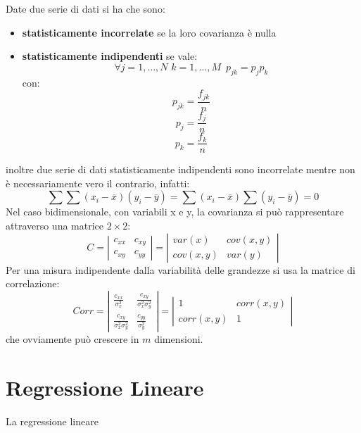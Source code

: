 \documentclass[a4paper,12pt, oneside]{book}
\begin{document}
Date due serie di dati si ha che sono:
\begin{itemize}
    \item \textbf{statisticamente incorrelate} se la loro covarianza è nulla
    \item \textbf{statisticamente indipendenti} se vale:
        \[ \forall j=1, \dots, N\,\,k=1, \dots, M\,\,\, p_{jk} = p_jp_k \]
             con:
            \[ p_{jk}=\frac{f_{jk}}{n} \]
            \[ p_{j}=\frac{f_{j}}{n} \]
            \[ p_{k}=\frac{f_{k}}{n} \]        
\end{itemize}
inoltre due serie di dati statisticamente indipendenti sono incorrelate mentre non è necessariamente vero il contrario, infatti:
\[ \sum \sum (x_i - \overline{x})(y_i - \overline{y}) = \sum (x_i - \overline{x}) \sum(y_i - \overline{y}) = 0 \]
Nel caso bidimensionale, con variabili x e y, la covarianza si può rappresentare attraverso una matrice $2 \times 2$:
\[ C = \left | \begin{matrix}
                c_{xx} & c_{xy}\\
                c_{xy} & c_	{yy}
                \end{matrix}\right| = \left|\begin{matrix}
                                            var(x) & cov(x,y)\\
                                            cov(x,y) & var(y)
                                            \end{matrix}\right| \]
Per una misura indipendente dalla variabilità delle grandezze si usa la matrice di correlazione:
\[ Corr=\left|\begin{matrix}
              \frac{c_{xx}}{\sigma_x^2} & \frac{c_{xy}}{\sigma_x^2\sigma_y^2} \\
              \frac{c_{xy}}{\sigma_x^2\sigma_y^2}   & \frac{c_{yy}}{\sigma_y^2} 
              \end{matrix}\right|=\left|\begin{matrix}
                                            1 & corr(x,y)\\
                                            corr(x,y) & 1
                                        \end{matrix}\right| \]
che ovviamente può crescere in $m$ dimensioni.

\section{Regressione Lineare}
La regressione lineare 
\end{document}
